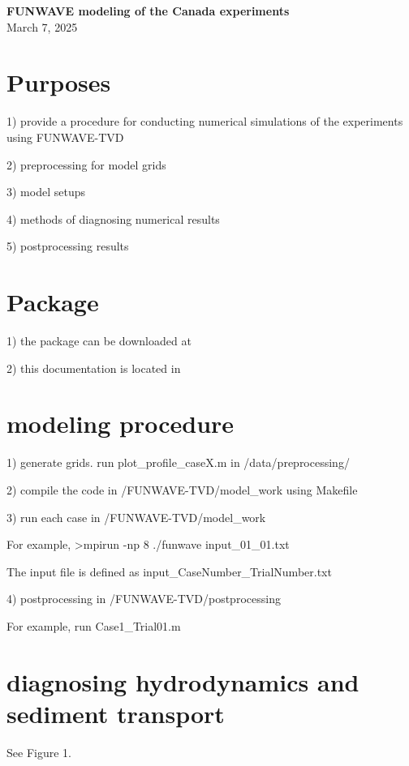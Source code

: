 \documentclass[preprint,10pt]{elsarticle}
\begin{document}


\begin{center}
{\bf \Huge FUNWAVE modeling of the Canada experiments}
\\
\vspace{1cm}
March 7, 2025
\end{center}

\section*{Purposes}

1) provide a procedure for conducting numerical simulations of the experiments using FUNWAVE-TVD

2) preprocessing for model grids

3) model setups

4) methods of diagnosing numerical results

5) postprocessing results
 

\section*{ Package}
 
 1) the package can be downloaded at
 
 2) this documentation is located in
 

\section*{modeling procedure}

1) generate grids. run plot\_profile\_caseX.m in /data/preprocessing/

2) compile the code in /FUNWAVE-TVD/model\_work using Makefile

3) run each case in /FUNWAVE-TVD/model\_work 
 
 For example, >mpirun -np 8 ./funwave input\_01\_01.txt 
 
 The input file is defined as input\_CaseNumber\_TrialNumber.txt
 
 4) postprocessing in  /FUNWAVE-TVD/postprocessing

For example, run Case1\_Trial01.m


\section*{diagnosing hydrodynamics and sediment transport}

See Figure 1. 
\end{document}
